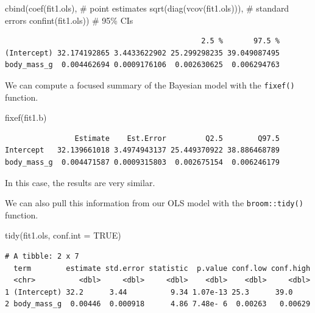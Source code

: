 \documentclass[
  letterpaper,
  DIV=11,
  numbers=noendperiod]{scrartcl}
\newenvironment{Shaded}{\begin{snugshade}}{\end{snugshade}}
\newcommand{\AttributeTok}[1]{\textcolor[rgb]{0.40,0.45,0.13}{#1}}
\newcommand{\CommentTok}[1]{\textcolor[rgb]{0.37,0.37,0.37}{#1}}
\newcommand{\ConstantTok}[1]{\textcolor[rgb]{0.56,0.35,0.01}{#1}}
\newcommand{\FunctionTok}[1]{\textcolor[rgb]{0.28,0.35,0.67}{#1}}
\newcommand{\NormalTok}[1]{\textcolor[rgb]{0.00,0.23,0.31}{#1}}
\begin{document}
\begin{Shaded}
\begin{Highlighting}[]
\FunctionTok{cbind}\NormalTok{(}\FunctionTok{coef}\NormalTok{(fit1.ols),              }\CommentTok{\# point estimates}
      \FunctionTok{sqrt}\NormalTok{(}\FunctionTok{diag}\NormalTok{(}\FunctionTok{vcov}\NormalTok{(fit1.ols))),  }\CommentTok{\# standard errors}
      \FunctionTok{confint}\NormalTok{(fit1.ols))           }\CommentTok{\# 95\% CIs}
\end{Highlighting}
\end{Shaded}

\begin{verbatim}
                                             2.5 %       97.5 %
(Intercept) 32.174192865 3.4433622902 25.299298235 39.049087495
body_mass_g  0.004462694 0.0009176106  0.002630625  0.006294763
\end{verbatim}

We can compute a focused summary of the Bayesian model with the
\texttt{fixef()} function.

\begin{Shaded}
\begin{Highlighting}[]
\FunctionTok{fixef}\NormalTok{(fit1.b)}
\end{Highlighting}
\end{Shaded}

\begin{verbatim}
                Estimate    Est.Error         Q2.5        Q97.5
Intercept   32.139661018 3.4974943137 25.449370922 38.886468789
body_mass_g  0.004471587 0.0009315803  0.002675154  0.006246179
\end{verbatim}

In this case, the results are very similar.

We can also pull this information from our OLS model with the
\texttt{broom::tidy()} function.

\begin{Shaded}
\begin{Highlighting}[]
\FunctionTok{tidy}\NormalTok{(fit1.ols, }\AttributeTok{conf.int =} \ConstantTok{TRUE}\NormalTok{)}
\end{Highlighting}
\end{Shaded}

\begin{verbatim}
# A tibble: 2 x 7
  term        estimate std.error statistic  p.value conf.low conf.high
  <chr>          <dbl>     <dbl>     <dbl>    <dbl>    <dbl>     <dbl>
1 (Intercept) 32.2      3.44          9.34 1.07e-13 25.3      39.0    
2 body_mass_g  0.00446  0.000918      4.86 7.48e- 6  0.00263   0.00629
\end{verbatim}
\end{document}
